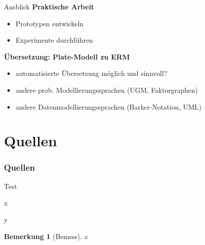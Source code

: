 \documentclass{beamer}
\newtheorem*{bem}{Bemerkung}
\begin{document}
\begin{frame}{Ausblick}
\textbf{Praktische Arbeit}
\begin{itemize}
\item Prototypen entwickeln
\item Experimente durchführen
\end{itemize}

\vspace*{2em}
\textbf{Übersetzung: Plate-Modell zu ERM}
\begin{itemize}
\item automatisierte Übersetzung möglich und sinnvoll?
\item andere prob. Modellierungssprachen (UGM, Faktorgraphen)
\item andere Datenmodellierungssprachen (Barker-Notation, UML)
\end{itemize}
\end{frame}

\section*{Quellen}
\begin{frame}
\frametitle{Quellen}
\def\bibfont{\scriptsize}
\printbibliography
\end{frame}

\begin{frame}{Test}

x
\begin{definition}[Definition]
y
\end{definition}

\begin{bem}[Bemsss]
x
\end{bem}
\end{frame}
\end{document}
